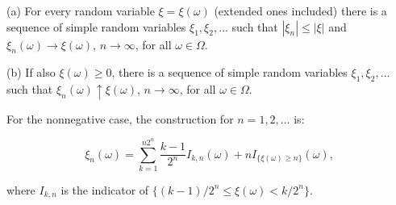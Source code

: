 (a) For every random variable $\xi = \xi(\omega)$ (extended ones included) there is a sequence of simple random variables $\xi_1, \xi_2, \ldots$ such that $|\xi_n| \leq |\xi|$ and $\xi_n(\omega) \to \xi(\omega)$, $n \to \infty$, for all $\omega \in \Omega$.

(b) If also $\xi(\omega) \geq 0$, there is a sequence of simple random variables $\xi_1, \xi_2, \ldots$ such that $\xi_n(\omega) \uparrow \xi(\omega)$, $n \to \infty$, for all $\omega \in \Omega$.

For the nonnegative case, the construction for $n = 1, 2, \ldots$ is:

$$\xi_n(\omega) = \sum_{k=1}^{n2^n} \frac{k-1}{2^n} I_{k,n}(\omega) + n I_{\{\xi(\omega) \geq n\}}(\omega),$$

where $I_{k,n}$ is the indicator of $\{(k-1)/2^n \leq \xi(\omega) < k/2^n\}$.

